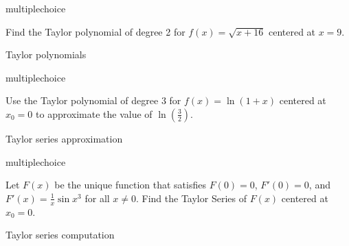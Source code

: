 \documentclass{ximera}
\begin{document}
\begin{question}[2016C.12]
\begin{type}
multiplechoice
\end{type}
Find the Taylor polynomial of degree 2 for \(f(x) = \sqrt{x+16}\) centered at \(x=9\).
\begin{multiplechoice}
 \choicebreak
{}
\end{multiplechoice}
\begin{keywords}
Taylor polynomials
\end{keywords}
\end{question}

\begin{question}[2017C.14]
\begin{type}
multiplechoice
\end{type}
Use the Taylor polynomial of degree \(3\) for \(f(x) = \ln (1+x)\) centered at \(x_0 = 0\) to approximate the value of \(\displaystyle \ln \left( \frac{3}{2} \right)\).
\begin{multiplechoice}
\end{multiplechoice}
\begin{keywords}
Taylor series approximation
\end{keywords}
\end{question}

\begin{question}[2017C.15]
\begin{type}
multiplechoice
\end{type}
Let \(F(x)\) be the unique function that satisfies \(F(0) = 0\), \(F'(0) = 0\), and \(F'(x) = \frac{1}{x} \sin x^3\) for all \(x \neq 0\). Find the Taylor Series of \(F(x)\) centered at \(x_0 = 0\).
\begin{multiplechoice}
 \choicebreak
{}
\end{multiplechoice}
\begin{keywords}
Taylor series computation
\end{keywords}
\end{question}
\end{document}
